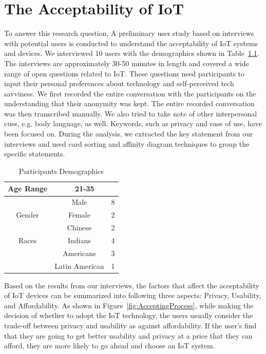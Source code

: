 
\chapter{The Acceptability of IoT}

To answer this research question, A preliminary user study based on interviews with potential users is conducted to understand the acceptability of IoT systems and devices. We interviewed 10 users with the demographics shown in Table~\ref{tab:demographics1}. The interviews are approximately 30-50 minutes in length and covered a wide range of open questions related to IoT. These questions need participants to input their personal preferences about technology and self-perceived tech savviness. We first recorded the entire conversation with the participants on the understanding that their anonymity was kept. The entire recorded conversation was then transcribed manually. We also tried to take note of other interpersonal cues, e.g. body language, as well. Keywords, such as privacy and ease of use, have been focused on. During the analysis, we extracted the key statement from our interviews and used card sorting and affinity diagram techniques to group the specific statements.

\begin {table}
\caption {Participants Demographics} \label{tab:demographics1}
\vspace{8pt}
\begin{center}
	\begin{tabular}{|c|c|c|}
		\hline
		Age Range & \multicolumn{2}{c|}{ 21-35 }\\
		\hline
		& Male & 8 \\
		\cline{2-3}
		Gender    & Female & 2 \\
		\hline
		& Chinese & 2 \\
		\cline{2-3}
		Races 	  & Indians & 4 \\
		\cline{2-3}
		& Americans & 3 \\
		\cline{2-3}
		& Latin American & 1\\
		\hline
	\end{tabular}
\end{center}
\end {table}

Based on the results from our interviews, the factors that affect the acceptability of IoT devices can be summarized into following three aspects: Privacy, Usability, and Affordability. As shown in Figure~\ref{fig:AcceptingProcess}, while making the decision of whether to adopt the IoT technology, the users usually consider the trade-off between privacy and usability as against affordability. If the user's find that they are going to get better usability and privacy at a price that they can afford, they are more likely to go ahead and choose an IoT system. 

